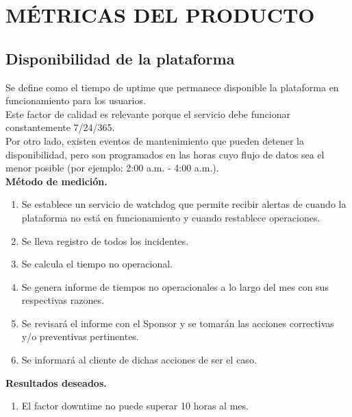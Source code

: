 \chapter{M\'ETRICAS DEL PRODUCTO}
%
\section{Disponibilidad de la plataforma}
%
Se define como el tiempo de uptime que permanece disponible la plataforma en funcionamiento para los
usuarios.\\%
%
Este factor de calidad es relevante porque el servicio debe funcionar constantemente 7/24/365.\\
%
Por otro lado, existen eventos de mantenimiento que pueden detener la disponibilidad, pero son
programados en las horas cuyo flujo de datos sea el menor posible (por ejemplo: 2:00 a.m. - 4:00 a.m.).\\[0.5cm]%
%
\textbf{M\'etodo de medici\'on.}
%
\begin{enumerate}
	\item Se establece un servicio de watchdog que permite recibir alertas de cuando la plataforma no est\'a
		en funcionamiento y cuando restablece operaciones.
	\item Se lleva registro de todos los incidentes.
	\item Se calcula el tiempo no operacional.
	\item Se genera informe de tiempos no operacionales a lo largo del mes con sus respectivas razones.
	\item Se revisar\'a el informe con el Sponsor y se tomar\'an las acciones correctivas y/o preventivas
		pertinentes.
	\item Se informar\'a al cliente de dichas acciones de ser el caso.
\end{enumerate}
%
\textbf{Resultados deseados.}
%
\begin{enumerate}
	\item El factor downtime no puede superar 10 horas al mes.
\end{enumerate}